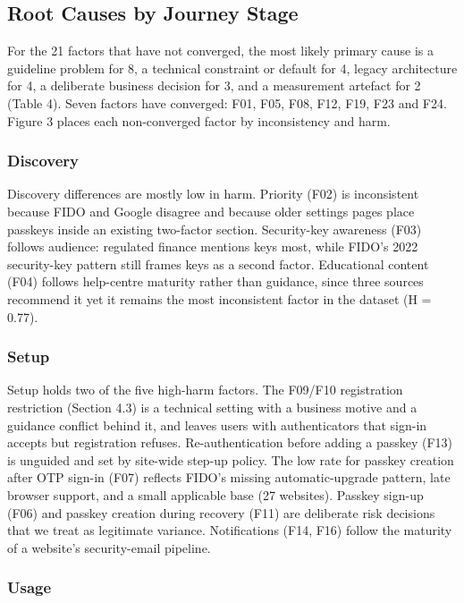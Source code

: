 \documentclass[letterpaper,twocolumn,10pt]{article}
\begin{document}
\subsection{Root Causes by Journey Stage}

For the 21 factors that have not converged, the most likely primary cause is a guideline problem for 8, a technical constraint or default for 4, legacy architecture for 4, a deliberate business decision for 3, and a measurement artefact for 2 (Table 4). Seven factors have converged: F01, F05, F08, F12, F19, F23 and F24. Figure 3 places each non-converged factor by inconsistency and harm.

\subsubsection{Discovery}

Discovery differences are mostly low in harm. Priority (F02) is inconsistent because FIDO and Google disagree and because older settings pages place passkeys inside an existing two-factor section. Security-key awareness (F03) follows audience: regulated finance mentions keys most, while FIDO's 2022 security-key pattern still frames keys as a second factor. Educational content (F04) follows help-centre maturity rather than guidance, since three sources recommend it yet it remains the most inconsistent factor in the dataset (H = 0.77).

\subsubsection{Setup}

Setup holds two of the five high-harm factors. The F09/F10 registration restriction (Section 4.3) is a technical setting with a business motive and a guidance conflict behind it, and leaves users with authenticators that sign-in accepts but registration refuses. Re-authentication before adding a passkey (F13) is unguided and set by site-wide step-up policy. The low rate for passkey creation after OTP sign-in (F07) reflects FIDO's missing automatic-upgrade pattern, late browser support, and a small applicable base (27 websites). Passkey sign-up (F06) and passkey creation during recovery (F11) are deliberate risk decisions that we treat as legitimate variance. Notifications (F14, F16) follow the maturity of a website's security-email pipeline.

\subsubsection{Usage}
\end{document}
